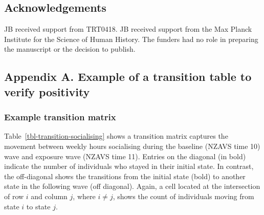 \documentclass[
  singlecolumn]{article}
\begin{document}
\newpage{}

\subsection{Acknowledgements}\label{acknowledgements}

JB received support from TRT0418. JB received support from the Max
Planck Institute for the Science of Human History. The funders had no
role in preparing the manuscript or the decision to publish.

\newpage{}

\subsection{Appendix A. Example of a transition table to verify
positivity}\label{appendix-a.-example-of-a-transition-table-to-verify-positivity}

\subsubsection{Example transition
matrix}\label{example-transition-matrix}

Table~\ref{tbl-transition-socialising} shows a transition matrix
captures the movement between weekly hours socialising during the
baseline (NZAVS time 10) wave and exposure wave (NZAVS time 11). Entries
on the diagonal (in bold) indicate the number of individuals who stayed
in their initial state. In contrast, the off-diagonal shows the
transitions from the initial state (bold) to another state in the
following wave (off diagonal). Again, a cell located at the intersection
of row \(i\) and column \(j\), where \(i \neq j\), shows the count of
individuals moving from state \(i\) to state \(j\).
\end{document}

